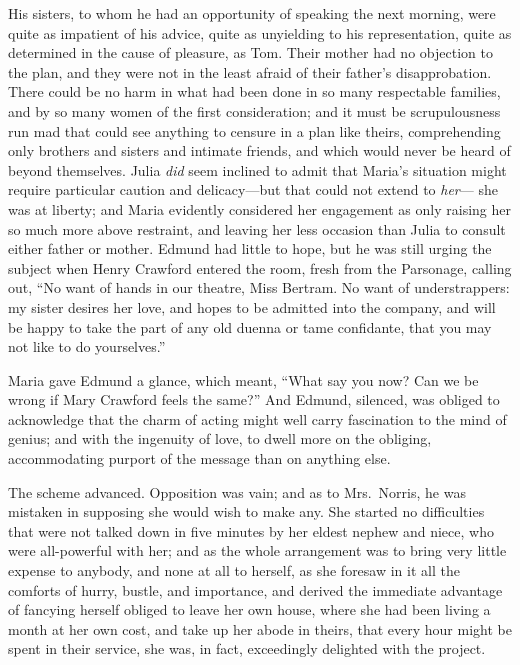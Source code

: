 His sisters, to whom he had an opportunity of speaking
the next morning, were quite as impatient of his advice,
quite as unyielding to his representation, quite as determined
in the cause of pleasure, as Tom.  Their mother had no
objection to the plan, and they were not in the least afraid
of their father's disapprobation.  There could be no harm
in what had been done in so many respectable families,
and by so many women of the first consideration; and it
must be scrupulousness run mad that could see anything to
censure in a plan like theirs, comprehending only brothers
and sisters and intimate friends, and which would never
be heard of beyond themselves.  Julia \emph{did} seem inclined
to admit that Maria's situation might require particular
caution and delicacy---but that could not extend to \emph{her}---%
she was at liberty; and Maria evidently considered her
engagement as only raising her so much more above restraint,
and leaving her less occasion than Julia to consult
either father or mother.  Edmund had little to hope,
but he was still urging the subject when Henry Crawford
entered the room, fresh from the Parsonage, calling out,
``No want of hands in our theatre, Miss Bertram.
No want of understrappers:  my sister desires her love,
and hopes to be admitted into the company, and will be happy
to take the part of any old duenna or tame confidante,
that you may not like to do yourselves.''

Maria gave Edmund a glance, which meant, ``What say you now?
Can we be wrong if Mary Crawford feels the same?''
And Edmund, silenced, was obliged to acknowledge that the
charm of acting might well carry fascination to the mind
of genius; and with the ingenuity of love, to dwell more
on the obliging, accommodating purport of the message
than on anything else.

The scheme advanced.  Opposition was vain; and as to
Mrs.\ Norris, he was mistaken in supposing she would wish
to make any.  She started no difficulties that were
not talked down in five minutes by her eldest nephew
and niece, who were all-powerful with her; and as the
whole arrangement was to bring very little expense
to anybody, and none at all to herself, as she foresaw
in it all the comforts of hurry, bustle, and importance,
and derived the immediate advantage of fancying herself
obliged to leave her own house, where she had been living
a month at her own cost, and take up her abode in theirs,
that every hour might be spent in their service, she was,
in fact, exceedingly delighted with the project.



